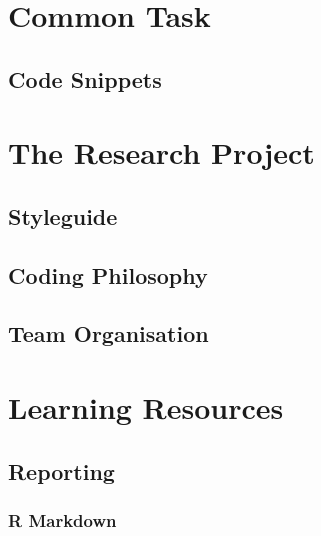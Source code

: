 \documentclass[
]{book}
\begin{document}
\hypertarget{common-task}{%
\chapter{Common Task}\label{common-task}}

\hypertarget{code-snippets}{%
\section{Code Snippets}\label{code-snippets}}

\hypertarget{section}{%
\subsubsection{}\label{section}}

\hypertarget{the-research-project}{%
\chapter{The Research Project}\label{the-research-project}}

\hypertarget{styleguide}{%
\section{Styleguide}\label{styleguide}}

\hypertarget{coding-philosophy}{%
\section{Coding Philosophy}\label{coding-philosophy}}

\hypertarget{team-organisation}{%
\section{Team Organisation}\label{team-organisation}}

\hypertarget{learning-resources}{%
\chapter{Learning Resources}\label{learning-resources}}

\hypertarget{reporting}{%
\section{Reporting}\label{reporting}}

\hypertarget{r-markdown}{%
\subsection{R Markdown}\label{r-markdown}}
\end{document}
